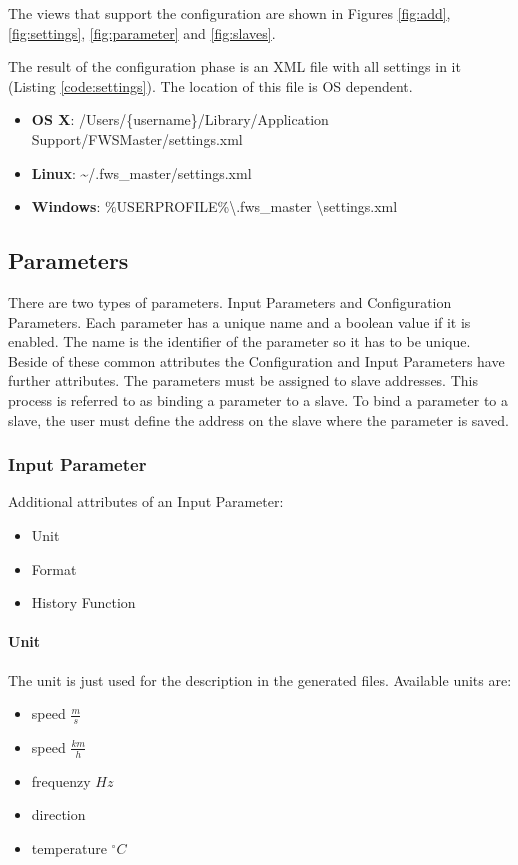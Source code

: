 The views that support the configuration are shown in Figures \ref{fig:add}, \ref{fig:settings}, \ref{fig:parameter} and \ref{fig:slaves}.

The result of the configuration phase is an XML file with all settings in it (Listing \ref{code:settings}). The location of this file is OS dependent. 
\begin{itemize}
    \item \textbf{OS X}: /Users/\{username\}/Library/Application Support/FWSMaster/settings.xml
    \item \textbf{Linux}: \textasciitilde /.fws\_master/settings.xml
    \item \textbf{Windows}: \%USERPROFILE\%\textbackslash .fws\_master \textbackslash settings.xml
\end{itemize}

{\C  }

\subsection{Parameters} %
\label{sub:parameters}
There are two types of parameters. Input Parameters and Configuration Parameters. Each parameter has a unique name and a boolean value if it is enabled. The name is the identifier of the parameter so it has to be unique. Beside of these common attributes the Configuration and Input Parameters have further attributes. The parameters must be assigned to slave addresses. This process is referred to as binding a parameter to a slave. To bind a parameter to a slave, the user must define the address on the slave where the parameter is saved.

\subsubsection{Input Parameter} %
\label{ssub:input_parameter}
Additional attributes of an Input Parameter:
\begin{itemize}
	\item Unit
	\item Format
	\item History Function
\end{itemize}

\paragraph{Unit} %
\label{par:unit}
The unit is just used for the description in the generated files. Available units are:
\begin{itemize}
	\item speed $\frac{m}{s}$
	\item speed $\frac{km}{h}$
	\item frequenzy $Hz$
	\item direction
	\item temperature $^\circ C$
\end{itemize}

